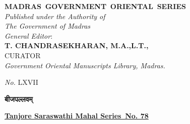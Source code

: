 \documentclass[11pt, openany]{book}
\begin{document}
 
\begin{center}
    {\englishfont
\textbf{\LARGE MADRAS\, GOVERNMENT\, ORIENTAL \,SERIES\\}
\vspace{4mm}
 \textit{Published under the Authority of\\}
\vspace{2mm}
\textit{The Government of Madras\\}
\vspace{5cm}
\textit{General Editor}:\\
\vspace{1mm}
\textbf{\large T. CHANDRASEKHARAN, M.A.,L.T.,\\}}
\vspace{1mm}
{\footnotesize CURATOR\\}
\vspace{1mm}
\textit{\englishfont Government Oriental Manuscripts Library, Madras.}
\end{center}
\vspace{5cm}
\begin{flushleft}
\englishfont
\textit{No.} LXVII\\
\end{flushleft}
\vspace{1cm}
\begin{center}
 \textbf{\LARGE बीजपल्लवम्}
\end{center}
  \thispagestyle{empty}
\newpage
 \thispagestyle{empty}
\textbf{\underline{\small Tanjore Saraswathi Mahal Series\textemdash\, No. 78}}\\
\vspace{2mm}
\end{document}
